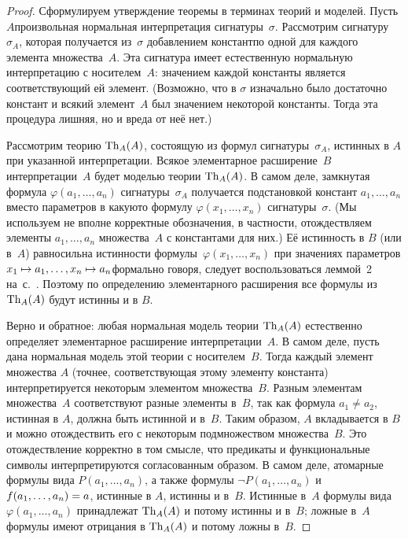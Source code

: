 \begin{proof}
Сформулируем утверждение теоремы в терминах теорий и моделей.
Пусть $A$\т произвольная нормальная интерпретация
сигнатуры~$\sigma$. Рассмотрим сигнатуру~$\sigma\!_A$, которая
получается из~$\sigma$ добавлением констант\т по одной для
каждого элемента множества~$A$. Эта сигнатура имеет естественную
нормальную интерпретацию с носителем~$A$: значением каждой
константы является соответствующий ей элемент. (Возможно, что в
$\sigma$ изначально было достаточно констант и всякий
элемент~$A$ был значением некоторой константы. Тогда эта
процедура лишняя, но и вреда от неё нет.)

Рассмотрим теорию $\operatorname{Th}_A(A)$, состоящую из формул
сигнатуры~$\sigma\!_A$, истинных в $A$ при указанной
интерпретации. Всякое элементарное расширение~$B$
интерпретации~$A$ будет моделью теории $\operatorname{Th}_A(A)$. В самом деле,
зам\-к\-ну\-тая формула $\varphi(a_1,\dots,a_n)$ сигнатуры~$\sigma\!_A$
получается подстановкой констант $a_1,\dots,a_n$ вместо
параметров в какую\д то формулу
$\varphi(x_1,\dots,x_n)$ сигнатуры~$\sigma$. (Мы используем не
вполне корректные обозначения, в частности, отождествляем
элементы $a_1,\dots,a_n$ множества~$A$ с константами для них.)
Её истинность в $B$ (или в~$A$) равносильна истинности
формулы~$\varphi(x_1,\dots,x_n)$ при значениях параметров
$x_1\hm\mapsto a_1,\dots,x_n\hm\mapsto a_n$\т фор\-маль\-но говоря,
следует воспользоваться леммой~2 на~с.~\pageref{trouble-lemma}.
Поэтому по определению элементарного расширения все формулы
из~$\operatorname{Th}_A(A)$ будут истинны и в $B$.

Верно и обратное: любая нормальная
модель теории $\operatorname{Th}_A(A)$ естественно
определяет элементарное расширение интерпретации~$A$. В самом
деле, пусть дана нормальная модель этой теории с носителем~$B$.
Тогда каждый элемент множества
$A$ (точнее, соответствующая этому элементу константа)
интерпретируется
некоторым элементом множества~$B$. Разным элементам множества~$A$
соответствуют разные элементы в~$B$, так как формула $a_1\ne
a_2$, истинная в $A$, должна быть истинной и в~$B$. Таким
образом, $A$ вкладывается в $B$ и можно отождествить его с
некоторым подмножеством множества~$B$. Это отождествление
корректно в том смысле, что предикаты и функциональные символы
интерпретируются согласованным образом. В самом деле, атомарные
формулы вида $P(a_1,\dots,a_n)$, а также формулы $\lnot
P(a_1,\dots,a_n)$ и $f(a_1,\dots,a_n)\hm= a$, истинные в $A$,
истинны и в~$B$. Истинные в~$A$ формулы вида
$\varphi(a_1,\dots,a_n)$ принадлежат $\operatorname{Th}_A(A)$ и потому истинны
и в~$B$; ложные в~$A$ формулы имеют отрицания в $\operatorname{Th}_A(A)$ и
потому ложны в~$B$.


\end{proof}
